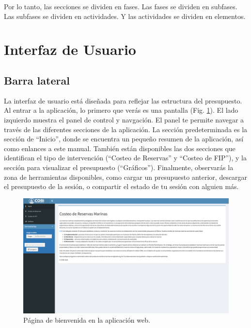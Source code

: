 \documentclass[
]{book}
\begin{document}
Por lo tanto, las secciones se dividen en fases. Las fases se dividen en subfases. Las subfases se dividen en actividades. Y las actividades se dividen en elementos.

\hypertarget{interfaz-de-usuario}{%
\section{Interfaz de Usuario}\label{interfaz-de-usuario}}

\hypertarget{barra-lateral}{%
\subsection{Barra lateral}\label{barra-lateral}}

La interfaz de usuario está diseñada para reflejar las estructura del presupuesto. Al entrar a la aplicación, lo primero que verás es una pantalla (Fig. \ref{fig:landing-page}). El lado izquierdo muestra el panel de control y navgación. El panel te permite navegar a través de las diferentes secciones de la aplicación. La sección predeterminada es la sección de ``Inicio'', donde se encuentra un pequeño resumen de la aplicación, así como enlances a este manual. También están disponibles las dos secciones que identifican el tipo de intervención (``Costeo de Reservas'' y ``Costeo de FIP''), y la sección para visualizar el presupuesto (``Gráficos''). Finalmente, observarás la zona de herramientas disponibles, como cargar un presupuesto anterior, descargar el presupuesto de la sesión, o compartir el estado de tu sesión con alguien más.

\begin{figure}
\includegraphics[width=49.67in]{images/Screen Shot 2022-07-25 at 2.43.50 PM} \caption{Página de bienvenida en la aplicación web.}\label{fig:landing-page}
\end{figure}
\end{document}
